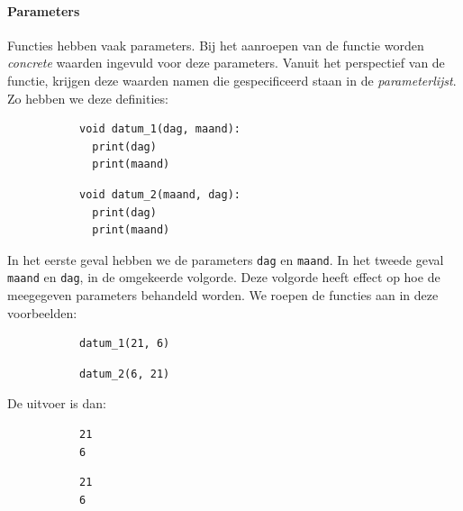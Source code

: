\paragraph{Parameters}

Functies hebben vaak parameters. Bij het aanroepen van de functie worden \emph{concrete} waarden ingevuld voor deze parameters. Vanuit het perspectief van de functie, krijgen deze waarden namen die gespecificeerd staan in de \emph{parameterlijst}. Zo hebben we deze definities:

\begin{figure}[h]
\begin{subfigure}[b]{.5\linewidth}
\begin{verbatim}
void datum_1(dag, maand):
  print(dag)
  print(maand)
\end{verbatim}
\end{subfigure}
\begin{subfigure}[b]{.5\linewidth}
\begin{verbatim}
void datum_2(maand, dag):
  print(dag)
  print(maand)
\end{verbatim}
\end{subfigure}
\end{figure}

In het eerste geval hebben we de parameters \texttt{dag} en \texttt{maand}. In het tweede geval \texttt{maand} en \texttt{dag}, in de omgekeerde volgorde. Deze volgorde heeft effect op hoe de meegegeven parameters behandeld worden. We roepen de functies aan in deze voorbeelden:

\begin{figure}[h]
\begin{subfigure}[b]{.5\linewidth}
\begin{verbatim}
datum_1(21, 6)
\end{verbatim}
\end{subfigure}
\begin{subfigure}[b]{.5\linewidth}
\begin{verbatim}
datum_2(6, 21)
\end{verbatim}
\end{subfigure}
\end{figure}

De uitvoer is dan:

\begin{figure}[h]
\begin{subfigure}[b]{.5\linewidth}
\begin{verbatim}
21
6
\end{verbatim}
\end{subfigure}
\begin{subfigure}[b]{.5\linewidth}
\begin{verbatim}
21
6
\end{verbatim}
\end{subfigure}
\end{figure}

